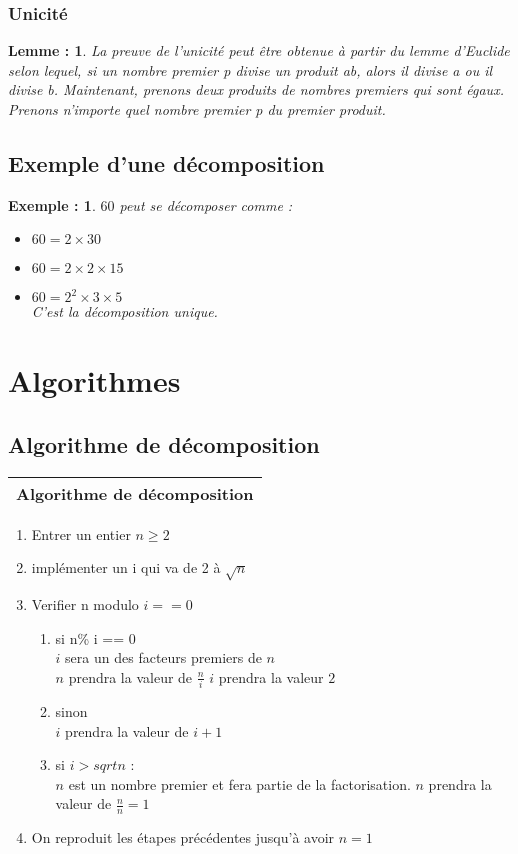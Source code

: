 \documentclass[titlepage]{article}
\newtheorem{exemple}{Exemple :}
\newtheorem{lemme}{Lemme :}
\begin{document}
\subsubsection{Unicité}
\begin{lemme}
La preuve de l'unicité peut être obtenue à partir du lemme d'Euclide selon lequel, si un nombre premier p divise un produit ab, alors il divise a ou il divise b. Maintenant, prenons deux produits de nombres premiers qui sont égaux. Prenons n'importe quel nombre premier p du premier produit.
\end{lemme}

\subsection{Exemple d'une décomposition}
\begin{exemple}
$60$ peut se décomposer comme :
\begin{itemize}
\item $60 = 2 \times 30$
\item $60 = 2 \times 2 \times 15$
\item $60 = 2^2 \times 3 \times 5$
\\C'est la décomposition unique.
\end{itemize}

\end{exemple}
\section{Algorithmes}

\subsection{Algorithme de décomposition}
\begin{tabular}{l}
\hline
Algorithme de décomposition\\
\hline 
\end{tabular}
\begin{enumerate}
\item Entrer un entier $n \geq 2$
\item implémenter un i qui va de 2 à $\sqrt{n}$
\item Verifier n modulo $i == 0$
\begin{enumerate}
\item si n\% i == 0\\
$i$ sera un des facteurs premiers de $n$\\
$n$ prendra la valeur de $\frac{n}{i}$
$i$ prendra la valeur $2$\\
\item sinon\\
$i$ prendra la valeur de $i + 1$
\item si $i > sqrt{n}$ :\\
$n$ est un nombre premier et fera partie de la factorisation.
$n$ prendra la valeur de $\frac{n}{n} = 1$
\end{enumerate}
\item On reproduit les étapes précédentes jusqu'à avoir $n = 1$
\end{enumerate}
\end{document}
